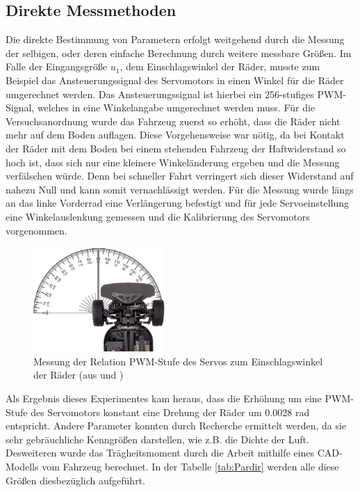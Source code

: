 \subsection{Direkte Messmethoden}
Die direkte Bestimmung von Parametern erfolgt weitgehend durch die Messung der selbigen, oder deren einfache Berechnung durch weitere messbare Größen. Im Falle der Eingangsgröße $u_{1}$, dem Einschlagswinkel der Räder, musste zum Beispiel das Ansteuerungssignal des Servomotors in einen Winkel für die Räder umgerechnet werden. Das Ansteuerungssignal ist hierbei ein 256-stufiges PWM-Signal, welches in eine Winkelangabe umgerechnet werden muss. Für die Versuchsanordnung wurde das Fahrzeug zuerst so erhöht, dass die Räder nicht mehr auf dem Boden auflagen. Diese Vorgehensweise war nötig, da bei Kontakt der Räder mit dem Boden bei einem stehenden Fahrzeug der Haftwiderstand so hoch ist, dass sich nur eine kleinere Winkeländerung ergeben und die Messung verfälschen würde. Denn bei schneller Fahrt verringert sich dieser Widerstand auf nahezu Null und kann somit vernachlässigt werden. Für die Messung wurde längs an das linke Vorderrad eine Verlängerung befestigt und für jede Servoeinstellung eine Winkelauslenkung gemessen und die Kalibrierung des Servomotors vorgenommen. 
\begin{figure}[H]
	\centering
	\includegraphics[width=5cm]{Bilder/u1Messung.png}
	\caption[Messng der Relation PWM-Stufe Servo zu Einschlagswinkel Räder]
		{Messung der Relation PWM-Stufe des Servos zum Einschlagswinkel der Räder (aus \cite{TT01} und \cite{Wim})}
	\label{pict:u1Mess}
\end{figure}
Als Ergebnis dieses Experimentes kam heraus, dass die Erhöhung um eine PWM-Stufe des Servomotors konstant eine Drehung der Räder um 0.0028 rad entspricht. Andere Parameter konnten durch Recherche ermittelt werden, da sie sehr gebräuchliche Kenngrößen darstellen, wie z.B. die Dichte der Luft. Desweiteren wurde das Trägheitsmoment durch die Arbeit \cite{TimMar} mithilfe eines CAD-Modells vom Fahrzeug berechnet. In der Tabelle \ref{tab:Pardir} werden alle diese Größen diesbezüglich aufgeführt.
